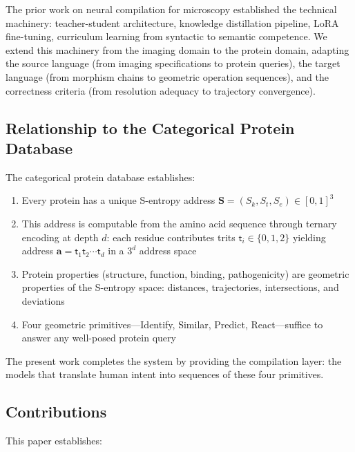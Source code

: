 \documentclass[11pt,twocolumn,a4paper]{article}
\theoremstyle{definition}
\theoremstyle{remark}
\newcommand{\Sk}{S_k}
\newcommand{\St}{S_t}
\newcommand{\Se}{S_e}
\newcommand{\Scoord}{\mathbf{S}}
\newcommand{\addr}{\mathbf{a}}
\newcommand{\trit}{\mathsf{t}}
\begin{document}
The prior work on neural compilation for microscopy \citep{sachikonye2025b} established the technical machinery: teacher-student architecture, knowledge distillation pipeline, LoRA fine-tuning, curriculum learning from syntactic to semantic competence. We extend this machinery from the imaging domain to the protein domain, adapting the source language (from imaging specifications to protein queries), the target language (from morphism chains to geometric operation sequences), and the correctness criteria (from resolution adequacy to trajectory convergence).

\subsection{Relationship to the Categorical Protein Database}

The categorical protein database \citep{sachikonye2025c} establishes:
\begin{enumerate}
    \item Every protein has a unique S-entropy address $\Scoord = (\Sk, \St, \Se) \in [0,1]^3$
    \item This address is computable from the amino acid sequence through ternary encoding at depth $d$: each residue contributes trits $\trit_i \in \{0, 1, 2\}$ yielding address $\addr = \trit_1 \trit_2 \cdots \trit_d$ in a $3^d$ address space
    \item Protein properties (structure, function, binding, pathogenicity) are geometric properties of the S-entropy space: distances, trajectories, intersections, and deviations
    \item Four geometric primitives---Identify, Similar, Predict, React---suffice to answer any well-posed protein query
\end{enumerate}

The present work completes the system by providing the compilation layer: the models that translate human intent into sequences of these four primitives.

\subsection{Contributions}

This paper establishes:
\end{document}
